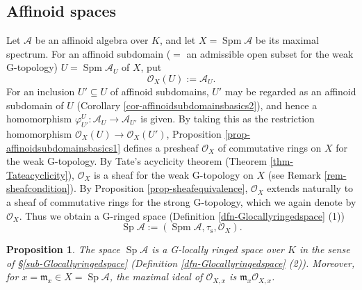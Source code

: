\documentclass[a4paper,12pt, dvipdfmx]{jsbook}
\def\O{\mathscr{O}}
\def\m{\mathfrak{m}}
\def\Spm{\mathop{\mathrm{Spm}}\nolimits}
\def\Sp{\mathop{\mathrm{Sp}}\nolimits}
\theoremstyle{plain}
\newtheorem{prop}[thm]{\bfseries Proposition}
\theoremstyle{definition}
\begin{document}
\subsection{Affinoid spaces}\label{sub-affinoidspaces}
Let $\mathcal{A}$ be an affinoid algebra over $K$, and let $X=\Spm\mathcal{A}$ be its maximal spectrum.
For an affinoid subdomain ($=$ an admissible open subset for the weak G-topology) $U=\Spm\mathcal{A}_U$ of $X$, put
$$
\O_X(U):=\mathcal{A}_U.
$$
For an inclusion $U'\subseteq U$ of affinoid subdomains, $U'$ may be regarded as an affinoid subdomain of $U$ (Corollary \ref{cor-affinoidsubdomainsbasics2}), and hence a homomorphism $\varphi^U_{U'}\colon\mathcal{A}_U\rightarrow\mathcal{A}_{U'}$ is given.
By taking this as the restriction homomorphism $\O_X(U)\rightarrow\O_X(U')$, Proposition \ref{prop-affinoidsubdomainsbasics1} defines a presheaf $\O_X$ of commutative rings on $X$ for the weak G-topology.
By Tate's acyclicity theorem (Theorem \ref{thm-Tateacyclicity}), $\O_X$ is a sheaf for the weak G-topology on $X$ (see Remark \ref{rem-sheafcondition}).
By Proposition \ref{prop-sheafequivalence}, $\O_X$ extends naturally to a sheaf of commutative rings for the strong G-topology, which we again denote by $\O_X$.
Thus we obtain a G-ringed space (Definition \ref{dfn-Glocallyringedspace} (1))
$$
\Sp\mathcal{A}:=(\Spm\mathcal{A},\tau_{\mathrm{s}},\O_X).
$$
\begin{prop}\label{prop-locallyringedaffinoids}{\rm 
The space $\Sp\mathcal{A}$ is a G-locally ringed space over $K$ in the sense of \S\ref{sub-Glocallyringedspace} (Definition \ref{dfn-Glocallyringedspace} (2)). Moreover, for $x=\m_x\in X=\Sp\mathcal{A}$, the maximal ideal of $\O_{X,x}$ is $\m_x\O_{X,x}$.}
\end{prop}
\end{document}
